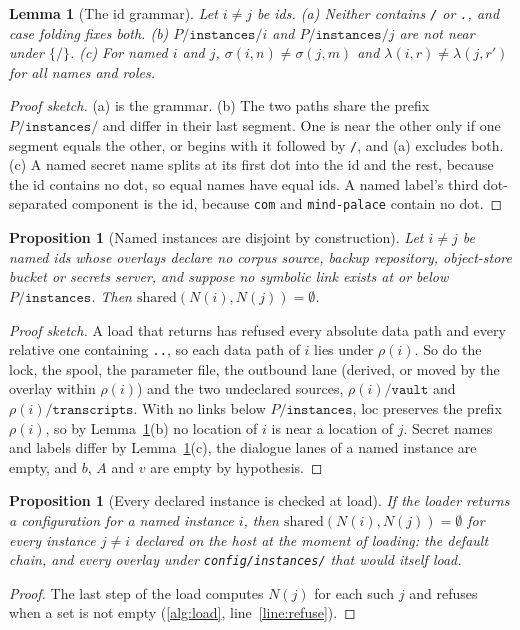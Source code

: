 \documentclass[11pt]{article}
\theoremstyle{plain}
\newtheorem{lemma}[theorem]{Lemma}
\newtheorem{proposition}[theorem]{Proposition}
\theoremstyle{definition}
\theoremstyle{remark}
\newcommand{\shared}{\mathrm{shared}}
\newcommand{\loc}{\mathrm{loc}}
\begin{document}
\begin{lemma}[The id grammar]\label{lem:grammar}
Let $i \neq j$ be ids. (a) Neither contains \texttt{/} or \texttt{.}, and case folding fixes both.
(b) $P/\texttt{instances}/i$ and $P/\texttt{instances}/j$ are not near under $\{/\}$. (c) For named
$i$ and $j$, $\sigma(i, n) \neq \sigma(j, m)$ and $\lambda(i, r) \neq \lambda(j, r')$ for all names
and roles.
\end{lemma}
\begin{proof}[Proof sketch]
(a) is the grammar. (b) The two paths share the prefix $P/\texttt{instances}/$ and differ in their
last segment. One is near the other only if one segment equals the other, or begins with it
followed by \texttt{/}, and (a) excludes both. (c) A named secret name splits at its first dot into
the id and the rest, because the id contains no dot, so equal names have equal ids. A named label's
third dot-separated component is the id, because \texttt{com} and \texttt{mind-palace} contain no
dot.
\end{proof}

\begin{proposition}[Named instances are disjoint by construction]\label{prop:named}
Let $i \neq j$ be named ids whose overlays declare no corpus source, backup repository, object-store
bucket or secrets server, and suppose no symbolic link exists at or below $P/\texttt{instances}$.
Then $\shared(N(i), N(j)) = \emptyset$.
\end{proposition}
\begin{proof}[Proof sketch]
A load that returns has refused every absolute data path and every relative one containing
\texttt{..}, so each data path of $i$ lies under $\rho(i)$. So do the lock, the spool, the
parameter file, the outbound lane (derived, or moved by the overlay within $\rho(i)$) and the two
undeclared sources, $\rho(i)/\texttt{vault}$ and $\rho(i)/\texttt{transcripts}$. With no links
below $P/\texttt{instances}$, $\loc$ preserves the prefix $\rho(i)$, so by
Lemma~\ref{lem:grammar}(b) no location of $i$ is near a location of $j$. Secret names and labels differ
by Lemma~\ref{lem:grammar}(c), the dialogue lanes of a named instance are empty, and $b$, $A$ and $v$ are
empty by hypothesis.
\end{proof}

\begin{proposition}[Every declared instance is checked at load]\label{prop:default}
If the loader returns a configuration for a named instance $i$, then $\shared(N(i), N(j)) =
\emptyset$ for every instance $j \neq i$ declared on the host at the moment of loading: the default
chain, and every overlay under \texttt{config/instances/} that would itself load.
\end{proposition}
\begin{proof}
The last step of the load computes $N(j)$ for each such $j$ and refuses when a set is not empty
(\cref{alg:load}, line~\ref{line:refuse}).
\end{proof}
\end{document}
